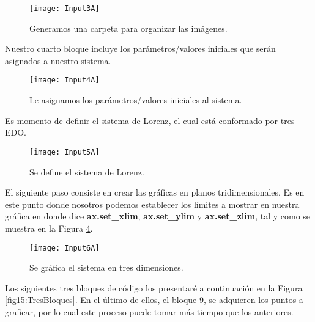 \begin{figure}[h!]
	\begin{center}
		\texttt{[image: Input3A]}
        \caption{Generamos una carpeta para organizar las imágenes.}
        \label{fig11:CarpetaA}
	\end{center}
\end{figure}

\vfill
\vline
\space
\par \vspace{4cm}

Nuestro cuarto bloque incluye los parámetros/valores iniciales que serán asignados a nuestro sistema.

\begin{figure}[h!]
	\begin{center}
		\texttt{[image: Input4A]}
        \caption{Le asignamos los parámetros/valores iniciales al sistema.}
        \label{fig12:ValoresA}
	\end{center}
\end{figure}

Es momento de definir el sistema de Lorenz, el cual está conformado por tres EDO.

\begin{figure}[h!]
	\begin{center}
		\texttt{[image: Input5A]}
        \caption{Se define el sistema de Lorenz.}
        \label{fig13:DefinirA}
	\end{center}
\end{figure}

El siguiente paso consiste en crear las gráficas en planos tridimensionales. Es en este punto donde nosotros podemos establecer los límites a mostrar en nuestra gráfica en donde dice \textbf{ax.set\_xlim}, \textbf{ax.set\_ylim} y \textbf{ax.set\_zlim}, tal y como se muestra en la Figura \ref{fig14:GraficarA}. \\

\begin{figure}[h!]
	\begin{center}
		\texttt{[image: Input6A]}
        \caption{Se gráfica el sistema en tres dimensiones.}
        \label{fig14:GraficarA}
	\end{center}
\end{figure}

Los siguientes tres bloques de código los presentaré a continuación en la Figura \ref{fig15:TresBloques}. En el último de ellos, el bloque 9, se adquieren los puntos a graficar, por lo cual este proceso puede tomar más tiempo que los anteriores.

